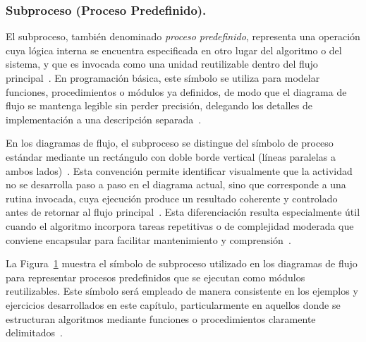 \documentclass[12pt,twoside]{book}
\begin{document}
					\subsubsection{Subproceso (Proceso Predefinido).}
						El subproceso, también denominado \textit{proceso predefinido}, representa una operación cuya lógica interna se encuentra especificada en otro lugar del algoritmo o del sistema, y que es invocada como una unidad reutilizable dentro del flujo principal~\cite{Joyanes2007Fundamentos,Manzano2017Programacion}. En programación básica, este símbolo se utiliza para modelar funciones, procedimientos o módulos ya definidos, de modo que el diagrama de flujo se mantenga legible sin perder precisión, delegando los detalles de implementación a una descripción separada~\cite{Pressman2019Software}.
						
						En los diagramas de flujo, el subproceso se distingue del símbolo de proceso estándar mediante un rectángulo con doble borde vertical (líneas paralelas a ambos lados)~\cite{SmartDrawFlowchartSymbols,Joyanes2007Fundamentos}. Esta convención permite identificar visualmente que la actividad no se desarrolla paso a paso en el diagrama actual, sino que corresponde a una rutina invocada, cuya ejecución produce un resultado coherente y controlado antes de retornar al flujo principal~\cite{Kendall2014Systems}. Esta diferenciación resulta especialmente útil cuando el algoritmo incorpora tareas repetitivas o de complejidad moderada que conviene encapsular para facilitar mantenimiento y comprensión~\cite{Pressman2019Software}.
						
						La Figura~\ref{fig:simbolo-subproceso} muestra el símbolo de subproceso utilizado en los diagramas de flujo para representar procesos predefinidos que se ejecutan como módulos reutilizables. Este símbolo será empleado de manera consistente en los ejemplos y ejercicios desarrollados en este capítulo, particularmente en aquellos donde se estructuran algoritmos mediante funciones o procedimientos claramente delimitados~\cite{Joyanes2007Fundamentos,Manzano2017Programacion}.
						
						\begin{figure}[h]
							\centering
							\label{fig:simbolo-subproceso}
						\end{figure}
				
\end{document}
